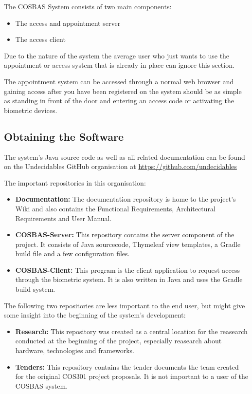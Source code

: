 The COSBAS System consists of two main components:
	\begin{itemize}
		\item{The access and appointment server}
		\item{The access client}
	\end{itemize}

Due to the nature of the system the average user who just wants to use the appointment or access system that is already in place can ignore this section.

The appointment system can be accessed through a normal web browser and gaining access after you have been registered on the system should be as simple as standing in front of the door and entering an access code or activating the biometric devices.

\subsection{Obtaining the Software}
The system's Java source code as  well as all related documentation can be found on the Undecidables GitHub organisation at \url{https://github.com/undecidables}

The important repositories in this organisation:
\begin{itemize}

	\item \textbf{Documentation:} The documentation repository is home to the project's Wiki and also contains the Functional Requirements, Architectural Requirements and User Manual.
	
	\item \textbf{COSBAS-Server:} This repository contains the server component of the project. It consists of Java sourcecode, Thymeleaf view templates, a Gradle build file and  a few configuration files.

	\item \textbf{COSBAS-Client:} This program is the client application to request access through the biometric system. It is also written in Java and uses the Gradle build system.

\end{itemize}

The following two repositories are less important to the end user, but might give some insight into the beginning of the system's development:
\begin{itemize}
	\item \textbf{Research:} This repository was created as a central location for the reasearch conducted at the beginning of the project, especially reasearch about hardware, technologies and frameworks.
	\item \textbf{Tenders:} This repository contains the tender documents the team created for the original COS301 project proposals. It is not important to a user of the COSBAS system.

\end{itemize}



